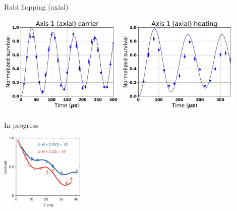 \documentclass{beamer}
\begin{document}
\begin{frame}{Rabi flopping (axial)}
  \begin{center}
    \includegraphics[height=4.8cm]{../../experiments/rabi_flop/imgs/fit_20170409_a1_0_nol.png}
    \includegraphics[height=4.8cm]{../../experiments/rabi_flop/imgs/fit_20170409_a1_p1_nol.png}
  \end{center}
\end{frame}

\begin{frame}{In progress}
\end{frame}

\begin{frame}{}
\end{frame}

\begin{frame}{}
\end{frame}

\begin{frame}{}
  \hypertarget<1>{backup-many-body-echo}{}
  \begin{center}
    \hyperlink{applications-many-body}{\includegraphics[width=4cm]{imgs/many-body-oscillation.png}}\\
  \end{center}
\end{frame}
\end{document}
